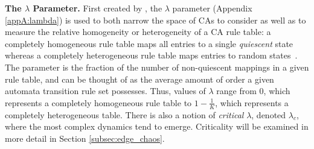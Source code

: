 \documentclass[a4paper,11pt]{article}
\begin{document}


\medskip

\noindent \textbf{The $\lambda$ Parameter.} First created by \citeauthor{la90}, the $\lambda$ parameter (Appendix \ref{appA:lambda}) is used to both narrow the space of CAs to consider as well as to measure the relative homogeneity or heterogeneity of a CA rule table: a completely homogeneous rule table maps all entries to a single \textit{quiescent} state whereas a completely heterogeneous rule table maps entries to random states~\cite{la90}. The parameter is the fraction of the number of non-quiescent mappings in a given rule table, and can be thought of as the average amount of order a given automata transition rule set possesses. Thus, values of $\lambda$ range from $0$, which represents a completely homogeneous rule table to $1 - \frac{1}{K}$, which represents a completely heterogeneous table. There is also a notion of \textit{critical} $\lambda$, denoted $\lambda_c$, where the most complex dynamics tend to emerge. Criticality will be examined in more detail in Section \ref{subsec:edge_chaos}.
\end{document}
